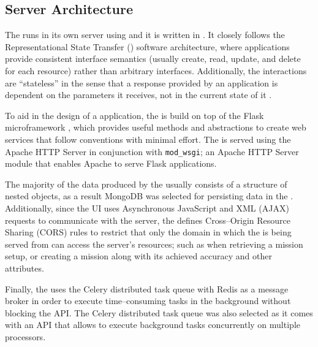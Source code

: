 \subsection{Server Architecture} \label{subsect:case-study:arch:server}

The \mlblinkapi runs in its own server using \ubuntu and it is written in \python. It closely follows the Representational State Transfer (\rest) software architecture, where applications provide consistent interface semantics (usually create, read, update, and delete for each resource) rather than arbitrary interfaces. Additionally, the \rest interactions are ``stateless'' in the sense that a response provided by an application is dependent on the parameters it receives, not in the current state of it \cite{web:w3:rest}. \newline

To aid in the design of a \rest application, the \mlblinkapi is build on top of the Flask microframework \cite{software:flask}, which provides useful methods and abstractions to create web services that follow \rest conventions with minimal effort. The \mlblinkapi is served using the Apache HTTP Server in conjunction with \texttt{mod\_wsgi}; an Apache HTTP Server module that enables Apache to serve Flask applications. \newline

The majority of the data produced by the \mlblinkui usually consists of a structure of nested objects, as a result MongoDB was selected for persisting data in the \mlblinkapi. Additionally, since the UI uses Asynchronous JavaScript and XML (AJAX) requests to communicate with the server, the \mlblinkapi defines Cross--Origin Resource Sharing (CORS) rules to restrict that only the domain in which the \mlblinkui is being served from can access the server's resources; such as when retrieving a mission setup, or creating a mission along with its achieved accuracy and other attributes. \newline

Finally, the \mlblinkapi uses the Celery distributed task queue \cite{software:celery} with Redis \cite{software:redis} as a message broker in order to execute time--consuming tasks in the background without blocking the API. The Celery distributed task queue was also selected as it comes with an API that allows to execute background tasks concurrently on multiple processors.